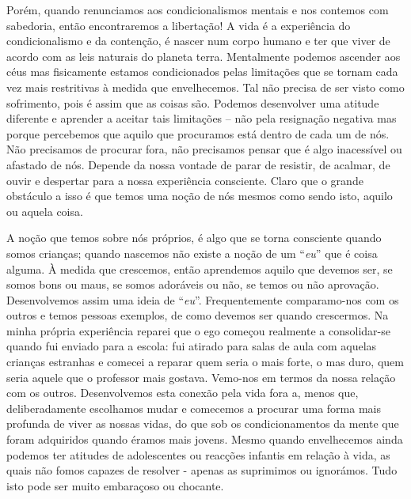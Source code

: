 Porém, quando renunciamos aos condicionalismos mentais e nos contemos
com sabedoria, então encontraremos a libertação! A vida é a experiência
do condicionalismo e da contenção, é nascer num corpo humano e ter que
viver de acordo com as leis naturais do planeta terra. Mentalmente
podemos ascender aos céus mas fisicamente estamos condicionados pelas
limitações que se tornam cada vez mais restritivas à medida que
envelhecemos. Tal não precisa de ser visto como sofrimento, pois é assim
que as coisas são. Podemos desenvolver uma atitude diferente e aprender
a aceitar tais limitações -- não pela resignação negativa mas porque
percebemos que aquilo que procuramos está dentro de cada um de nós. Não
precisamos de procurar fora, não precisamos pensar que é algo
inacessível ou afastado de nós. Depende da nossa vontade de parar de
resistir, de acalmar, de ouvir e despertar para a nossa experiência
consciente. Claro que o grande obstáculo a isso é que temos uma noção de
nós mesmos como sendo isto, aquilo ou aquela coisa.

A noção que temos sobre nós próprios, é algo que se torna consciente
quando somos crianças; quando nascemos não existe a noção de um
``\emph{eu}'' que é coisa alguma. À medida que crescemos, então aprendemos
aquilo que devemos ser, se somos bons ou maus, se somos adoráveis ou
não, se temos ou não aprovação. Desenvolvemos assim uma ideia de
``\emph{eu}''. Frequentemente comparamo-nos com os outros e temos
pessoas exemplos, de como devemos ser quando crescermos. Na minha
própria experiência reparei que o ego começou realmente a consolidar-se
quando fui enviado para a escola: fui atirado para salas de aula com
aquelas crianças estranhas e comecei a reparar quem seria o mais forte,
o mas duro, quem seria aquele que o professor mais gostava. Vemo-nos em
termos da nossa relação com os outros. Desenvolvemos esta conexão pela
vida fora a, menos que, deliberadamente escolhamos mudar e comecemos a
procurar uma forma mais profunda de viver as nossas vidas, do que sob os
condicionamentos da mente que foram adquiridos quando éramos mais
jovens. Mesmo quando envelhecemos ainda podemos ter atitudes de
adolescentes ou reacções infantis em relação à vida, as quais não fomos
capazes de resolver - apenas as suprimimos ou ignorámos. Tudo isto pode
ser muito embaraçoso ou chocante.

